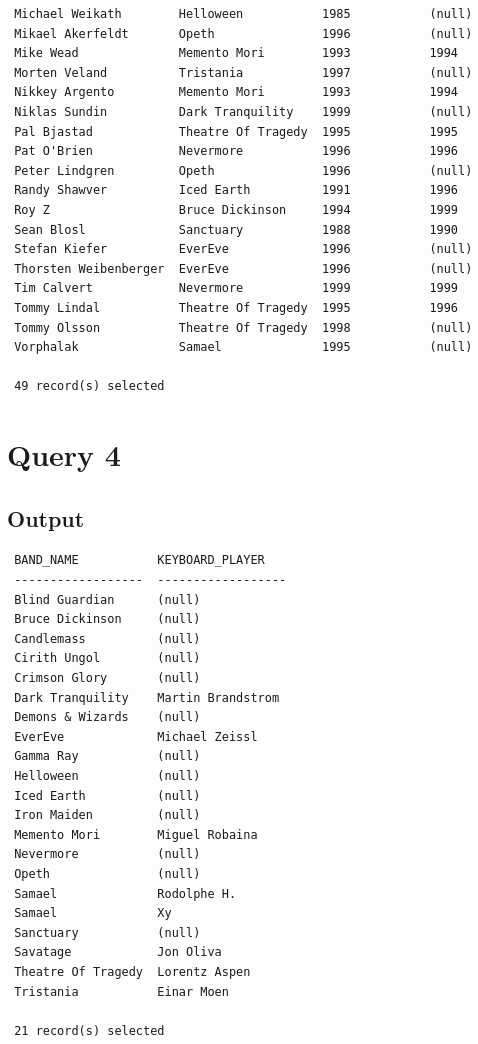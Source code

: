 \documentclass{report}
\begin{document}
\begin{verbatim}
 Michael Weikath        Helloween           1985           (null)      
 Mikael Akerfeldt       Opeth               1996           (null)      
 Mike Wead              Memento Mori        1993           1994        
 Morten Veland          Tristania           1997           (null)      
 Nikkey Argento         Memento Mori        1993           1994        
 Niklas Sundin          Dark Tranquility    1999           (null)      
 Pal Bjastad            Theatre Of Tragedy  1995           1995        
 Pat O'Brien            Nevermore           1996           1996        
 Peter Lindgren         Opeth               1996           (null)      
 Randy Shawver          Iced Earth          1991           1996        
 Roy Z                  Bruce Dickinson     1994           1999        
 Sean Blosl             Sanctuary           1988           1990        
 Stefan Kiefer          EverEve             1996           (null)      
 Thorsten Weibenberger  EverEve             1996           (null)      
 Tim Calvert            Nevermore           1999           1999        
 Tommy Lindal           Theatre Of Tragedy  1995           1996        
 Tommy Olsson           Theatre Of Tragedy  1998           (null)      
 Vorphalak              Samael              1995           (null)      

 49 record(s) selected
\end{verbatim}


\section*{Query 4}
\subsection*{Output}
\begin{verbatim}
 BAND_NAME           KEYBOARD_PLAYER    
 ------------------  ------------------ 
 Blind Guardian      (null)             
 Bruce Dickinson     (null)             
 Candlemass          (null)             
 Cirith Ungol        (null)             
 Crimson Glory       (null)             
 Dark Tranquility    Martin Brandstrom  
 Demons & Wizards    (null)             
 EverEve             Michael Zeissl     
 Gamma Ray           (null)             
 Helloween           (null)             
 Iced Earth          (null)             
 Iron Maiden         (null)             
 Memento Mori        Miguel Robaina     
 Nevermore           (null)             
 Opeth               (null)             
 Samael              Rodolphe H.        
 Samael              Xy                 
 Sanctuary           (null)             
 Savatage            Jon Oliva          
 Theatre Of Tragedy  Lorentz Aspen      
 Tristania           Einar Moen         

 21 record(s) selected
\end{verbatim}
\end{document}
